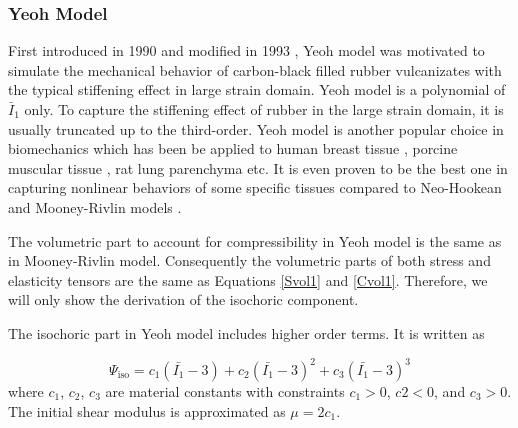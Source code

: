 %
\subsubsection{Yeoh Model}
First introduced in 1990 \cite{Yeoh} and modified in 1993 \cite{Yeoh2}, Yeoh model was motivated to simulate the mechanical behavior of carbon-black filled rubber vulcanizates with the typical stiffening effect in large strain domain. Yeoh model is a polynomial of $\bar{I}_1$ only.  To capture the stiffening effect of rubber in the large strain domain, it is usually truncated up to the third-order. Yeoh model is another popular choice in biomechanics which has been be applied to human breast tissue \cite{OHagen}, porcine muscular tissue \cite{Bols2}, rat lung parenchyma \cite{Wall, Wall2} etc. It is even proven to be the best one in capturing nonlinear behaviors of some specific tissues compared to Neo-Hookean and Mooney-Rivlin models \cite{Zaeimdar}.

The volumetric part to account for compressibility in Yeoh model is the same as in Mooney-Rivlin model. Consequently the volumetric parts of both stress and elasticity tensors are the same as Equations \ref{Svol1} and \ref{Cvol1}. Therefore, we will only show the derivation of the isochoric component.

The isochoric part in Yeoh model includes higher order terms. It is written as

\begin{equation} \label{iso2}
\Psi_\mathrm{iso} = c_1(\bar{I_1} - 3) + c_2(\bar{I_1} - 3)^2 + c_3(\bar{I_1} - 3)^3
\end{equation}
where $c_1$, $c_2$, $c_3$ are material constants with constraints $c_1 > 0$, $c2 < 0$, and $c_3 > 0$. The initial shear modulus is approximated as $\mu = 2c_1$.

